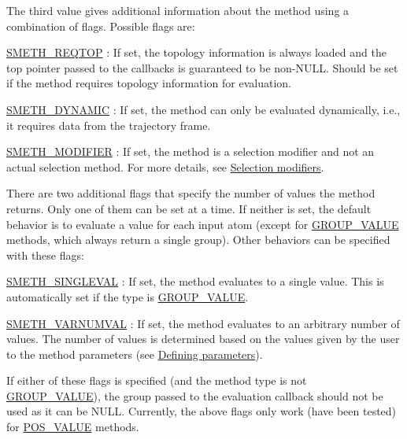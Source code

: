 \-The third value gives additional information about the method using a combination of flags. \-Possible flags are\-:
\begin{DoxyItemize}
\item \hyperlink{share_2template_2gromacs_2selmethod_8h_ac5e632efef31120c54b55eac79cb23cc}{\-S\-M\-E\-T\-H\-\_\-\-R\-E\-Q\-T\-O\-P} \-: \-If set, the topology information is always loaded and the {\ttfamily top} pointer passed to the callbacks is guaranteed to be non-\/\-N\-U\-L\-L. \-Should be set if the method requires topology information for evaluation.
\item \hyperlink{share_2template_2gromacs_2selmethod_8h_af38b0eb2b4e305ae83ded06f9b12252e}{\-S\-M\-E\-T\-H\-\_\-\-D\-Y\-N\-A\-M\-I\-C} \-: \-If set, the method can only be evaluated dynamically, i.\-e., it requires data from the trajectory frame.
\item \hyperlink{share_2template_2gromacs_2selmethod_8h_aa5b18df47b72690889afd89f5e68694c}{\-S\-M\-E\-T\-H\-\_\-\-M\-O\-D\-I\-F\-I\-E\-R} \-: \-If set, the method is a selection modifier and not an actual selection method. \-For more details, see \hyperlink{selmethods_selmethods_modifiers}{\-Selection modifiers}.
\end{DoxyItemize}

\-There are two additional flags that specify the number of values the method returns. \-Only one of them can be set at a time. \-If neither is set, the default behavior is to evaluate a value for each input atom (except for \hyperlink{share_2template_2gromacs_2selvalue_8h_a70b42b87d434580bf1493591857b8beca70a2af6eafa48adfab506ceee60471f6}{\-G\-R\-O\-U\-P\-\_\-\-V\-A\-L\-U\-E} methods, which always return a single group). \-Other behaviors can be specified with these flags\-:
\begin{DoxyItemize}
\item \hyperlink{share_2template_2gromacs_2selmethod_8h_a2de9fc1fca93570388059f72b064df08}{\-S\-M\-E\-T\-H\-\_\-\-S\-I\-N\-G\-L\-E\-V\-A\-L} \-: \-If set, the method evaluates to a single value. \-This is automatically set if the type is \hyperlink{share_2template_2gromacs_2selvalue_8h_a70b42b87d434580bf1493591857b8beca70a2af6eafa48adfab506ceee60471f6}{\-G\-R\-O\-U\-P\-\_\-\-V\-A\-L\-U\-E}.
\item \hyperlink{share_2template_2gromacs_2selmethod_8h_ae0aa6a1bbb99ba5f0f6228c4cd401e0a}{\-S\-M\-E\-T\-H\-\_\-\-V\-A\-R\-N\-U\-M\-V\-A\-L} \-: \-If set, the method evaluates to an arbitrary number of values. \-The number of values is determined based on the values given by the user to the method parameters (see \hyperlink{selmethods_selmethods_params}{\-Defining parameters}).
\end{DoxyItemize}\-If either of these flags is specified (and the method type is not \hyperlink{share_2template_2gromacs_2selvalue_8h_a70b42b87d434580bf1493591857b8beca70a2af6eafa48adfab506ceee60471f6}{\-G\-R\-O\-U\-P\-\_\-\-V\-A\-L\-U\-E}), the group passed to the evaluation callback should not be used as it can be \-N\-U\-L\-L. \-Currently, the above flags only work (have been tested) for \hyperlink{share_2template_2gromacs_2selvalue_8h_a70b42b87d434580bf1493591857b8beca31a47fbfbc85ad1472ce3d2a168fd1ec}{\-P\-O\-S\-\_\-\-V\-A\-L\-U\-E} methods.

